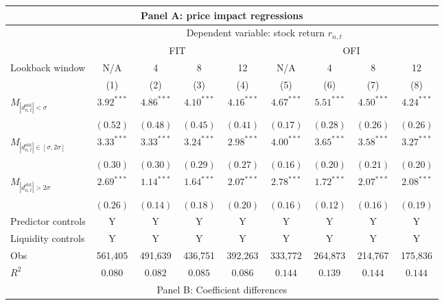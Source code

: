 \begin{tabular}{lcccccccc}
  \hline \multicolumn{9}{c}{Panel A: price impact regressions} \\
 \hline 
                                    & \multicolumn{8}{c}{Dependent variable: stock return $r_{n,t}$} \\

                                    \cmidrule(l){2-9} & \multicolumn{4}{c}{FIT} & \multicolumn{4}{c}{OFI} \\
 \cmidrule(l){2-5} \cmidrule(l){6-9} \vspace{5pt} 
 Lookback window & N/A & 4 & 8 & 12 & N/A & 4 & 8 & 12 \\
 \cmidrule(l){2-5} \cmidrule(l){6-9}  & (1) & (2) & (3) & (4) & (5) & (6) & (7) & (8) \\ 
  $M_{|d^\text{std}_{n,t}| < \sigma}$ & $3.92^{***}$ & $4.86^{***}$ & $4.10^{***}$ & $4.16^{***}$ & $4.67^{***}$ & $5.51^{***}$ & $4.50^{***}$ & $4.24^{***}$ \\ 
   & $(0.52)$ & $(0.48)$ & $(0.45)$ & $(0.41)$ & $(0.17)$ & $(0.28)$ & $(0.26)$ & $(0.26)$ \\ 
  $M_{|d^\text{std}_{n,t}| \in [\sigma, 2\sigma]}$ & $3.33^{***}$ & $3.33^{***}$ & $3.24^{***}$ & $2.98^{***}$ & $4.00^{***}$ & $3.65^{***}$ & $3.58^{***}$ & $3.27^{***}$ \\ 
   & $(0.30)$ & $(0.30)$ & $(0.29)$ & $(0.27)$ & $(0.16)$ & $(0.20)$ & $(0.21)$ & $(0.20)$ \\ 
  $M_{|d^\text{std}_{n,t}| > 2\sigma}$ & $2.69^{***}$ & $1.14^{***}$ & $1.64^{***}$ & $2.07^{***}$ & $2.78^{***}$ & $1.72^{***}$ & $2.07^{***}$ & $2.08^{***}$ \\ 
   \vspace{5pt} & $(0.26)$ & $(0.14)$ & $(0.18)$ & $(0.20)$ & $(0.16)$ & $(0.12)$ & $(0.16)$ & $(0.19)$ \\ 
  Predictor controls & Y & Y & Y & Y & Y & Y & Y & Y \\ 
   \vspace{5pt}Liquidity controls & Y & Y & Y & Y & Y & Y & Y & Y \\ 
  Obs & 561,405 & 491,639 & 436,751 & 392,263 & 333,772 & 264,873 & 214,767 & 175,836 \\ 
  $R^2$ & $0.080$ & $0.082$ & $0.085$ & $0.086$ & $0.144$ & $0.139$ & $0.144$ & $0.144$ \\ 
   \hline \multicolumn{9}{c}{Panel B: Coefficient differences} \\

\end{tabular}
